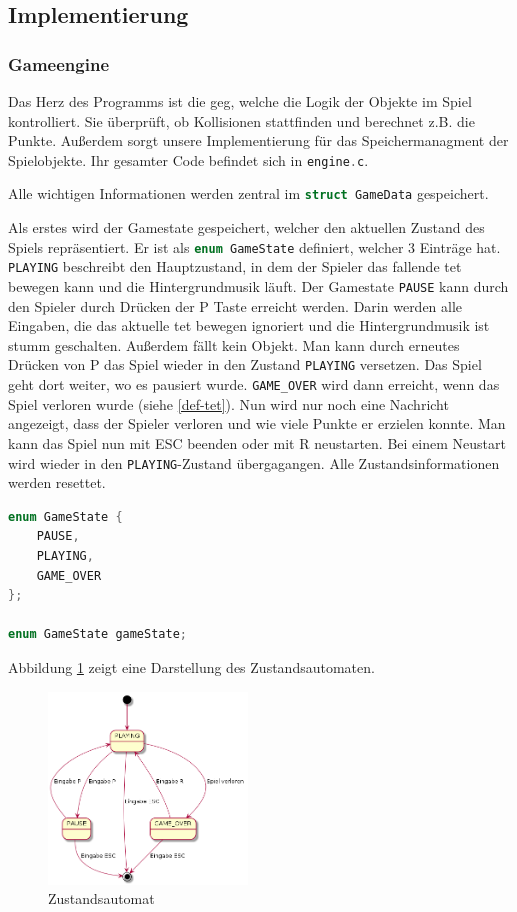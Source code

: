 \documentclass[11pt]{article}
\newcommand{\lstin}[1]{\lstinline[language=C]{#1}}
\newcommand{\refabb}[1]{Abbildung \ref{#1}}
\begin{document}
\subsection{Implementierung} 

\subsubsection{Gameengine} \label{gem}

Das Herz des Programms ist die \gls{geg}, welche die Logik der Objekte im Spiel kontrolliert.
Sie überprüft, ob Kollisionen stattfinden und berechnet z.B. die Punkte. 
Außerdem sorgt unsere Implementierung für das Speichermanagment der Spielobjekte.
Ihr gesamter Code befindet sich in \lstin{engine.c}.

Alle wichtigen Informationen werden zentral im \lstin{struct GameData} gespeichert.

Als erstes wird der Gamestate gespeichert, welcher den aktuellen Zustand des Spiels repräsentiert.
Er ist als \lstin{enum GameState} definiert, welcher 3 Einträge hat. 
\lstin{PLAYING} beschreibt den Hauptzustand, in dem der Spieler das fallende \gls{tet} bewegen kann und die Hintergrundmusik läuft.
Der Gamestate \lstin{PAUSE} kann durch den Spieler durch Drücken der P Taste erreicht werden. 
Darin werden alle Eingaben, die das aktuelle \gls{tet} bewegen ignoriert und die Hintergrundmusik ist stumm geschalten. Außerdem fällt kein Objekt.
Man kann durch erneutes Drücken von P das Spiel wieder in den Zustand \lstin{PLAYING} versetzen. Das Spiel geht dort weiter, wo es pausiert wurde.
\lstin{GAME_OVER} wird dann erreicht, wenn das Spiel verloren wurde (siehe \ref{def-tet}). 
Nun wird nur noch eine Nachricht angezeigt, dass der Spieler verloren und wie viele Punkte er erzielen konnte. Man kann das Spiel nun mit ESC beenden oder mit R neustarten.
Bei einem Neustart wird wieder in den \lstin{PLAYING}-Zustand übergagangen. Alle Zustandsinformationen werden resettet.

\begin{lstlisting}[language=C]
enum GameState {
    PAUSE,
    PLAYING,
    GAME_OVER
};

enum GameState gameState;
\end{lstlisting}

\refabb{state} zeigt eine Darstellung des Zustandsautomaten.

\begin{figure}[h]
  \centering
  \includegraphics[width=200px]{../state.png}
  \caption{Zustandsautomat}
  \label{state}
\end{figure}
\end{document}
